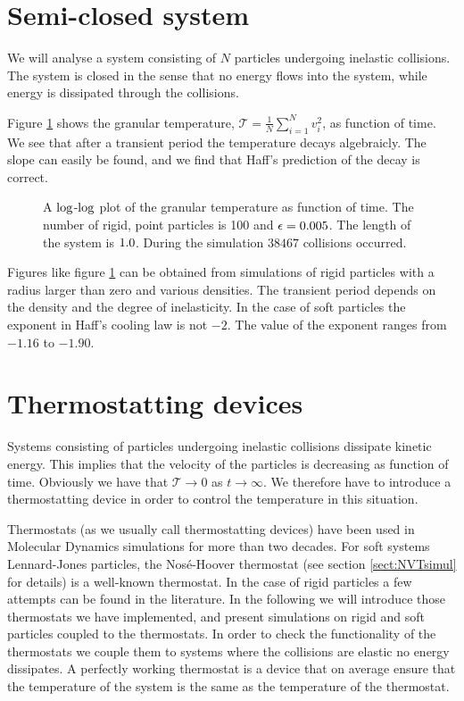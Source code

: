 \section{Semi-closed system}
\label{sect:SemiClosed}
We will analyse a system consisting of $N$ particles
undergoing inelastic collisions. The system is closed in the sense
that no energy flows into the system, while energy is dissipated
through the collisions.

Figure \ref{fig:RigidSemiClosed} shows the granular temperature,
$\mathcal{T} = \frac{1}{N} \sum_{i=1}^N v_i^2$, as function of time. We
see that after a transient period the temperature decays algebraicly. The
slope can easily be found, and we find that Haff's prediction of the
decay is correct.

\begin{figure}
  \begin{center}
  \end{center}
  \caption[The cooling problem]{A
    \protect$\log\protect$-\protect$\log\protect$ plot of 
    the granular temperature as function of time. The number of rigid,
    point particles is 100 and \protect$\epsilon=0.005\protect$. The
    length of the system is
    \protect$1.0\protect$. During the simulation $38467$ collisions
    occurred.\label{fig:RigidSemiClosed}}
\end{figure}

Figures like figure \ref{fig:RigidSemiClosed} can be obtained from
simulations of rigid particles with a radius larger than zero and
various densities. The transient period depends on the density and the
degree of inelasticity. In the case of soft particles the exponent in
Haff's cooling law is not $-2$. The value of the exponent ranges from $-1.16$
to $-1.90$.


\section{Thermostatting devices}
\label{sect:ThermoDevice}
Systems consisting of particles undergoing inelastic collisions
dissipate kinetic energy. This implies that the velocity of the
particles is decreasing as function of time. Obviously we have that
$\mathcal{T} \rightarrow 0$ as $t \rightarrow \infty$. We therefore
have to introduce a thermostatting device in order to control the
temperature in this situation.

Thermostats (as we usually call thermostatting devices) have been used
in Molecular Dynamics simulations for more than two decades. For soft
systems \eg Lennard-Jones particles, the Nos{\'{e}}-Hoover
thermostat (see section \ref{sect:NVTsimul} for details) is a
well-known thermostat. In the case of rigid particles a few attempts
can be found in the literature. In the following we will introduce those
thermostats we have implemented, and present simulations on rigid and
soft particles coupled to the thermostats. In order to check the
functionality of the thermostats we couple them to systems where the
collisions are elastic \ie no energy dissipates. A perfectly working
thermostat is a device that on average ensure that the temperature of
the system is the same as the temperature of the thermostat.

